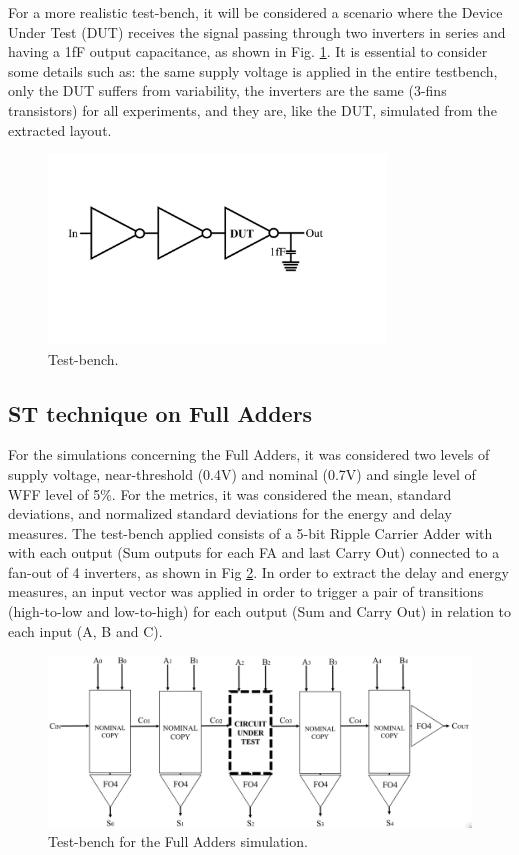 \documentclass[pgmicro,mestrado,english]{iiufrgs}
\begin{document}
 For a more realistic test-bench, it will be considered a scenario where the Device Under Test (DUT) receives the signal passing through two inverters in series and having a 1fF output capacitance, as shown in Fig. \ref{fig:tbST}. It is essential to consider some details such as: the same supply voltage is applied in the entire testbench, only the DUT suffers from variability, the inverters are the same (3-fins transistors) for all experiments, and they are, like the DUT, simulated from the extracted layout.

\begin{figure}[]
\centering
\includegraphics[width=0.8\textwidth, trim={2cm 7cm 6cm 5cm},clip]{testbench.pdf}
\caption{Test-bench.}
\label{fig:tbST}
\end{figure}

\subsection{ST technique on Full Adders}

For the simulations concerning the Full Adders, it was considered two levels of supply voltage, near-threshold (0.4V) and nominal (0.7V) and single level of WFF level of 5\%. For the metrics, it was considered the mean, standard deviations, and normalized standard deviations for the energy and delay measures. The test-bench applied consists of a 5-bit Ripple Carrier Adder with with each output (Sum outputs for each FA and last Carry Out) connected to a fan-out of 4 inverters, as shown in Fig \ref{fig:tbFA}. In order to extract the delay and energy measures, an input vector was applied in order to trigger a pair of transitions (high-to-low and low-to-high) for each output (Sum and Carry Out) in relation to each input (A, B and C).

\begin{figure}[]
\centering
\includegraphics[width=\textwidth, trim={0cm 0cm 0cm 0cm},clip]{testbenchFA.png}
\caption{Test-bench for the Full Adders simulation.}
\label{fig:tbFA}
\end{figure}
\end{document}
